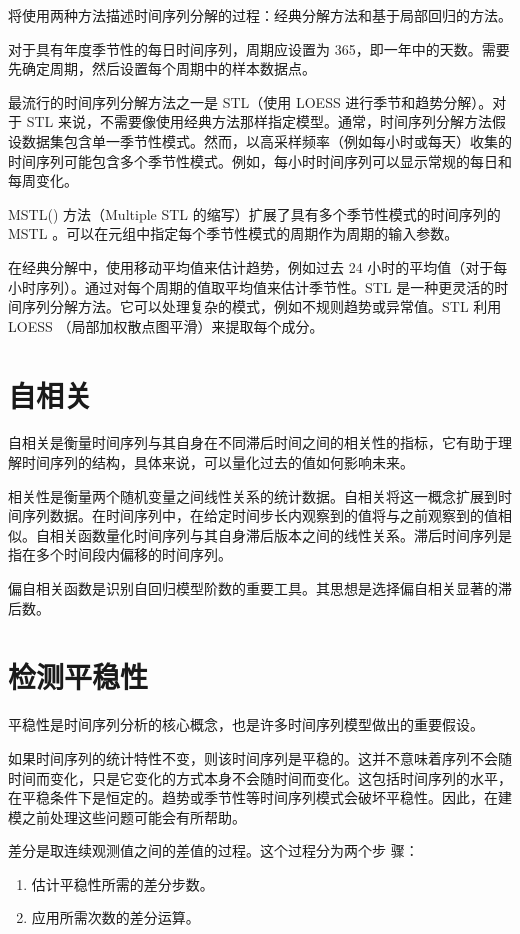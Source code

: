 将使用两种方法描述时间序列分解的过程：经典分解方法和基于局部回归的方法。

对于具有年度季节性的每日时间序列，周期应设置为 365，即一年中的天数。需要先确定周期，然后设置每个周期中的样本数据点。

最流行的时间序列分解方法之一是 STL（使用 LOESS 进行季节和趋势分解）。对于 STL 来说，不需要像使用经典方法那样指定模型。通常，时间序列分解方法假设数据集包含单一季节性模式。然而，以高采样频率（例如每小时或每天）收集的时间序列可能包含多个季节性模式。例如，每小时时间序列可以显示常规的每日和每周变化。

MSTL() 方法（Multiple STL 的缩写）扩展了具有多个季节性模式的时间序列的 MSTL 。可以在元组中指定每个季节性模式的周期作为周期的输入参数。

在经典分解中，使用移动平均值来估计趋势，例如过去 24 小时的平均值（对于每小时序列）。通过对每个周期的值取平均值来估计季节性。STL 是一种更灵活的时间序列分解方法。它可以处理复杂的模式，例如不规则趋势或异常值。STL 利用 LOESS （局部加权散点图平滑）来提取每个成分。
\section{自相关}
自相关是衡量时间序列与其自身在不同滞后时间之间的相关性的指标，它有助于理解时间序列的结构，具体来说，可以量化过去的值如何影响未来。

相关性是衡量两个随机变量之间线性关系的统计数据。自相关将这一概念扩展到时间序列数据。在时间序列中，在给定时间步长内观察到的值将与之前观察到的值相似。自相关函数量化时间序列与其自身滞后版本之间的线性关系。滞后时间序列是指在多个时间段内偏移的时间序列。

偏自相关函数是识别自回归模型阶数的重要工具。其思想是选择偏自相关显著的滞后数。
\section{检测平稳性}
平稳性是时间序列分析的核心概念，也是许多时间序列模型做出的重要假设。

如果时间序列的统计特性不变，则该时间序列是平稳的。这并不意味着序列不会随时间而变化，只是它变化的方式本身不会随时间而变化。这包括时间序列的水平，在平稳条件下是恒定的。趋势或季节性等时间序列模式会破坏平稳性。因此，在建模之前处理这些问题可能会有所帮助。

差分是取连续观测值之间的差值的过程。这个过程分为两个步
骤：
\begin{enumerate}
    \item 估计平稳性所需的差分步数。
    \item 应用所需次数的差分运算。
\end{enumerate}

